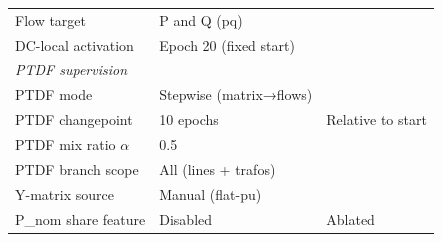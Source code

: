 \begin{table}[htbp]
\begin{tabular}{lll}
    Flow target             & P and Q (pq)              & \\
    DC-local activation     & Epoch 20 (fixed start)    & \\
    \midrule
    \multicolumn{3}{l}{\textit{PTDF supervision}} \\[2pt]
    PTDF mode               & Stepwise (matrix→flows)   & \\
    PTDF changepoint        & 10 epochs                 & Relative to start \\
    PTDF mix ratio $\alpha$ & 0.5                       & \\
    PTDF branch scope       & All (lines + trafos)      & \\
    Y-matrix source         & Manual (flat-pu)          & \\
    P\_nom share feature    & Disabled                  & Ablated \\
    \bottomrule
  \end{tabular}
\end{table}
